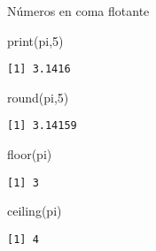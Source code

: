\documentclass[
  ignorenonframetext,
]{beamer}
\newenvironment{Shaded}{\begin{snugshade}}{\end{snugshade}}
\newcommand{\DecValTok}[1]{\textcolor[rgb]{0.00,0.00,0.81}{#1}}
\newcommand{\FunctionTok}[1]{\textcolor[rgb]{0.00,0.00,0.00}{#1}}
\newcommand{\NormalTok}[1]{#1}
\begin{document}
\begin{frame}[fragile]{Números en coma flotante}
\protect\hypertarget{nuxfameros-en-coma-flotante-1}{}
\begin{Shaded}
\begin{Highlighting}[]
\FunctionTok{print}\NormalTok{(pi,}\DecValTok{5}\NormalTok{)}
\end{Highlighting}
\end{Shaded}

\begin{verbatim}
[1] 3.1416
\end{verbatim}

\begin{Shaded}
\begin{Highlighting}[]
\FunctionTok{round}\NormalTok{(pi,}\DecValTok{5}\NormalTok{)}
\end{Highlighting}
\end{Shaded}

\begin{verbatim}
[1] 3.14159
\end{verbatim}

\begin{Shaded}
\begin{Highlighting}[]
\FunctionTok{floor}\NormalTok{(pi)}
\end{Highlighting}
\end{Shaded}

\begin{verbatim}
[1] 3
\end{verbatim}

\begin{Shaded}
\begin{Highlighting}[]
\FunctionTok{ceiling}\NormalTok{(pi)}
\end{Highlighting}
\end{Shaded}

\begin{verbatim}
[1] 4
\end{verbatim}
\end{frame}
\end{document}
